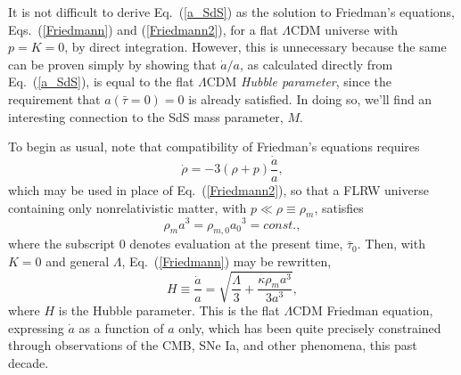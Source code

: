 It is not difficult to derive Eq.~(\ref{a_SdS}) as the solution to Friedman's equations, Eqs.~(\ref{Friedmann}) and (\ref{Friedmann2}), for a flat $\Lambda$CDM universe with $p=K=0$, by direct integration. However, this is unnecessary because the same can be proven simply by showing that $\dot{a}/a$, as calculated directly from Eq.~(\ref{a_SdS}), is equal to the flat $\Lambda$CDM \textit{Hubble parameter}, since the requirement that $a(\bar\tau=0)=0$ is already satisfied. In doing so, we'll find an interesting connection to the SdS mass parameter, $M$.

To begin as usual, note that compatibility of Friedman's equations requires
\begin{equation}
\dot{\rho}=-3(\rho+p)\frac{\dot{a}}{a},
\end{equation}
which may be used in place of Eq.~(\ref{Friedmann2}), so that a FLRW universe containing only nonrelativistic matter, with $p\ll\rho\equiv\rho_m$, satisfies
\begin{equation}
\rho_m{a^3}=\rho_{m,0}{a_0}^3=const.,\label{varrho}
\end{equation}
where the subscript 0 denotes evaluation at the present time, $\bar\tau_0$. Then, with $K=0$ and general $\Lambda$, Eq.~(\ref{Friedmann}) may be rewritten,
\begin{equation}
H\equiv\frac{\dot{a}}{a}=\sqrt{\frac{\Lambda}{3}+\frac{\kappa\rho_m{a}^3}{3a^3}},
\end{equation}
where $H$ is the Hubble parameter. This is the flat $\Lambda$CDM Friedman equation, expressing $\dot{a}$ as a function of $a$ only, which has been quite precisely constrained through observations of the CMB, SNe Ia, and other phenomena, this past decade.


